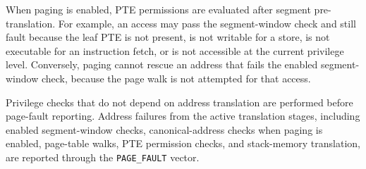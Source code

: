 When paging is enabled, PTE permissions are evaluated after segment pre-translation.
For example, an access may pass the segment-window check and still fault because the
leaf PTE is not present, is not writable for a store, is not executable for an instruction
fetch, or is not accessible at the current privilege level. Conversely, paging cannot
rescue an address that fails the enabled segment-window check, because the page walk is
not attempted for that access.

Privilege checks that do not depend on address translation are performed before page-fault
reporting. Address failures from the active translation stages, including enabled
segment-window checks, canonical-address checks when paging is enabled, page-table walks,
PTE permission checks, and stack-memory translation, are reported through the
\texttt{PAGE\_FAULT} vector.
